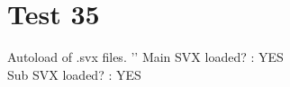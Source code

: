 \documentclass[12pt]{report}
\gdef\mainsvxgotloaded{YES}
\gdef\subsvxgotloaded{YES}
\begin{document}
\chapter{Test 35}
Autoload of .svx files.
'\svnextern{}'
Main SVX loaded? : \mainsvxgotloaded \\

Sub SVX loaded? : \subsvxgotloaded \\
\end{document}
